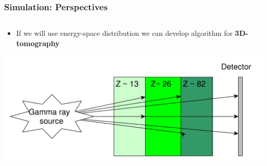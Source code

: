 \documentclass[11pt]{beamer}
\begin{document}
    \begin{frame}
    \frametitle{Simulation: Perspectives}
    \begin{columns}
                \begin{column}{1\textwidth}
                    \begin{itemize}
                        \item If we will use energy-space distribution we can develop algorithm for \textbf{3D-tomography} 
                      
                    \end{itemize}

                \includegraphics[width=1\textwidth]{figures/yed_schema_2.pdf}
                
            \end{column}
    \end{columns}  
\end{frame}
\end{document}

